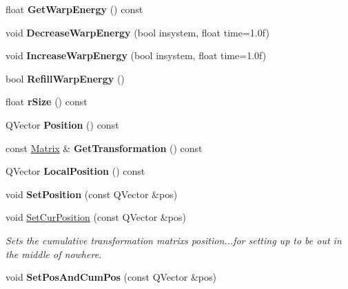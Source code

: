 \begin{DoxyCompactItemize}
\item 
float {\bfseries Get\+Warp\+Energy} () const \hypertarget{classUnit_a3d4cf13ff6acc4a77b2ede3d672c304a}{}\label{classUnit_a3d4cf13ff6acc4a77b2ede3d672c304a}

\item 
void {\bfseries Decrease\+Warp\+Energy} (bool insystem, float time=1.\+0f)\hypertarget{classUnit_aec052b334985b77fc235a38d4e5c7eda}{}\label{classUnit_aec052b334985b77fc235a38d4e5c7eda}

\item 
void {\bfseries Increase\+Warp\+Energy} (bool insystem, float time=1.\+0f)\hypertarget{classUnit_a1059319ec3e3f2f3f6328ca09207865b}{}\label{classUnit_a1059319ec3e3f2f3f6328ca09207865b}

\item 
bool {\bfseries Refill\+Warp\+Energy} ()\hypertarget{classUnit_a8043ae84629f6172dc3c2113ea02c1ea}{}\label{classUnit_a8043ae84629f6172dc3c2113ea02c1ea}

\item 
float {\bfseries r\+Size} () const \hypertarget{classUnit_a7d09318b824f72c0a814b1c2ff80561e}{}\label{classUnit_a7d09318b824f72c0a814b1c2ff80561e}

\item 
Q\+Vector {\bfseries Position} () const \hypertarget{classUnit_a0201d2ac56d5f9eb5d4ee377499f033e}{}\label{classUnit_a0201d2ac56d5f9eb5d4ee377499f033e}

\item 
const \hyperlink{classMatrix}{Matrix} \& {\bfseries Get\+Transformation} () const \hypertarget{classUnit_a0cd1fe5a6a1767631902fc30b8039f63}{}\label{classUnit_a0cd1fe5a6a1767631902fc30b8039f63}

\item 
Q\+Vector {\bfseries Local\+Position} () const \hypertarget{classUnit_a50df85e4527294773f6fbbf02e1d1141}{}\label{classUnit_a50df85e4527294773f6fbbf02e1d1141}

\item 
void {\bfseries Set\+Position} (const Q\+Vector \&pos)\hypertarget{classUnit_a3e1aa799a3fcbe6de004fb2ac89207c2}{}\label{classUnit_a3e1aa799a3fcbe6de004fb2ac89207c2}

\item 
void \hyperlink{classUnit_a6264138d8e1510a8feeef566e97e6299}{Set\+Cur\+Position} (const Q\+Vector \&pos)\hypertarget{classUnit_a6264138d8e1510a8feeef566e97e6299}{}\label{classUnit_a6264138d8e1510a8feeef566e97e6299}

\begin{DoxyCompactList}\small\item\em Sets the cumulative transformation matrix\textquotesingle{}s position...for setting up to be out in the middle of nowhere. \end{DoxyCompactList}\item 
void {\bfseries Set\+Pos\+And\+Cum\+Pos} (const Q\+Vector \&pos)\hypertarget{classUnit_a014f41b36598df3e31da2bca1ba9722e}{}\label{classUnit_a014f41b36598df3e31da2bca1ba9722e}


\end{DoxyCompactItemize}
